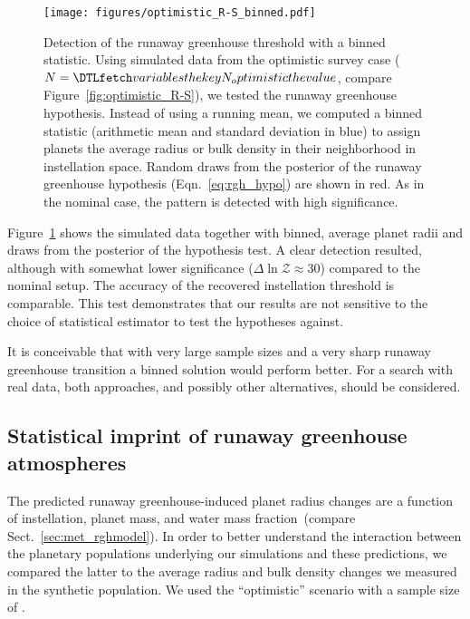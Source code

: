 \documentclass[twocolumn,twocolappendix,linenumbers]{aastex631}
\begin{document}
\begin{figure}[ht!]
    \begin{centering}
        \texttt{[image: figures/optimistic\_R-S\_binned.pdf]}
        \caption{
            Detection of the runaway greenhouse threshold with a binned statistic.
            Using simulated data from the optimistic survey case ($N = \var{N_optimistic}$, compare Figure~\ref{fig:optimistic_R-S}), we tested the runaway greenhouse hypothesis. Instead of using a running mean, we computed a binned statistic (arithmetic mean and standard deviation in blue) to assign planets the average radius or bulk density in their neighborhood in instellation space. Random draws from the posterior of the runaway greenhouse hypothesis (Eqn.~\ref{eq:rgh_hypo}) are shown in red.
            As in the nominal case, the pattern is detected with high significance.
        }
        \label{fig:optimistic_R-S_binned}
    \end{centering}
\end{figure}
Figure~\ref{fig:optimistic_R-S_binned} shows the simulated data together with binned, average planet radii and draws from the posterior of the hypothesis test.
A clear detection resulted, although with somewhat lower significance ($\Delta \ln \mathcal{Z} \approx 30$) compared to the nominal setup.
The accuracy of the recovered instellation threshold is comparable.
This test demonstrates that our results are not sensitive to the choice of statistical estimator to test the hypotheses against.

It is conceivable that with very large sample sizes and a very sharp runaway greenhouse transition a binned solution would perform better.
For a search with real data, both approaches, and possibly other alternatives, should be considered.

\subsection{Statistical imprint of runaway greenhouse atmospheres}\label{app:model-pop_comparison}
The predicted runaway greenhouse-induced planet radius changes are a function of instellation, planet mass, and  water mass fraction~(compare Sect.~\ref{sec:met_rghmodel}).
In order to better understand the interaction between the planetary populations underlying our simulations and these predictions, we compared the latter to the average radius and bulk density changes we measured in the synthetic population.
We used the ``optimistic'' scenario with a sample size of .
\end{document}
